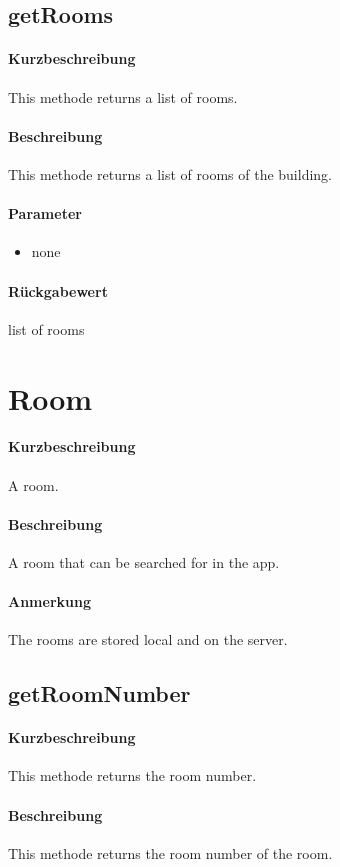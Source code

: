 \subsection{getRooms}%
\paragraph*{Kurzbeschreibung}
This methode returns a list of rooms.
\paragraph*{Beschreibung}
This methode returns a list of rooms of the building.
\paragraph*{Parameter}
\begin{itemize}
    \item none
\end{itemize}
\paragraph*{Rückgabewert}
list of rooms


\section{Room}
\paragraph*{Kurzbeschreibung}
A room.
\paragraph*{Beschreibung}
A room that can be searched for in the app.
\paragraph*{Anmerkung}
The rooms are stored local and on the server.

\subsection{getRoomNumber}%
\paragraph*{Kurzbeschreibung}
This methode returns the room number.
\paragraph*{Beschreibung}
This methode returns the room number of the room.
